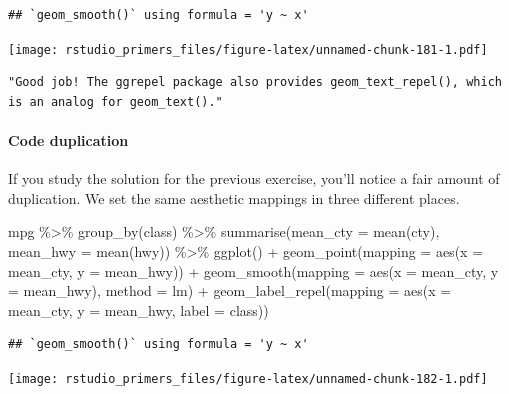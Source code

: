 \documentclass[
]{article}
\newenvironment{Shaded}{\begin{snugshade}}{\end{snugshade}}
\newcommand{\AttributeTok}[1]{\textcolor[rgb]{0.77,0.63,0.00}{#1}}
\newcommand{\FunctionTok}[1]{\textcolor[rgb]{0.00,0.00,0.00}{#1}}
\newcommand{\NormalTok}[1]{#1}
\newcommand{\SpecialCharTok}[1]{\textcolor[rgb]{0.00,0.00,0.00}{#1}}
\begin{document}
\begin{verbatim}
## `geom_smooth()` using formula = 'y ~ x'
\end{verbatim}

\texttt{[image: rstudio\_primers\_files/figure-latex/unnamed-chunk-181-1.pdf]}

\begin{verbatim}
"Good job! The ggrepel package also provides geom_text_repel(), which is an analog for geom_text()."
\end{verbatim}

\hypertarget{code-duplication}{%
\paragraph{Code duplication}\label{code-duplication}}

If you study the solution for the previous exercise, you'll notice a
fair amount of duplication. We set the same aesthetic mappings in three
different places.

\begin{Shaded}
\begin{Highlighting}[]
\NormalTok{mpg }\SpecialCharTok{\%\textgreater{}\%} 
  \FunctionTok{group\_by}\NormalTok{(class) }\SpecialCharTok{\%\textgreater{}\%} 
  \FunctionTok{summarise}\NormalTok{(}\AttributeTok{mean\_cty =} \FunctionTok{mean}\NormalTok{(cty), }\AttributeTok{mean\_hwy =} \FunctionTok{mean}\NormalTok{(hwy)) }\SpecialCharTok{\%\textgreater{}\%} 
  \FunctionTok{ggplot}\NormalTok{() }\SpecialCharTok{+}
    \FunctionTok{geom\_point}\NormalTok{(}\AttributeTok{mapping =} \FunctionTok{aes}\NormalTok{(}\AttributeTok{x =}\NormalTok{ mean\_cty, }\AttributeTok{y =}\NormalTok{ mean\_hwy)) }\SpecialCharTok{+}
    \FunctionTok{geom\_smooth}\NormalTok{(}\AttributeTok{mapping =} \FunctionTok{aes}\NormalTok{(}\AttributeTok{x =}\NormalTok{ mean\_cty, }\AttributeTok{y =}\NormalTok{ mean\_hwy), }\AttributeTok{method =}\NormalTok{ lm) }\SpecialCharTok{+}
    \FunctionTok{geom\_label\_repel}\NormalTok{(}\AttributeTok{mapping =} \FunctionTok{aes}\NormalTok{(}\AttributeTok{x =}\NormalTok{ mean\_cty, }\AttributeTok{y =}\NormalTok{ mean\_hwy, }\AttributeTok{label =}\NormalTok{ class))}
\end{Highlighting}
\end{Shaded}

\begin{verbatim}
## `geom_smooth()` using formula = 'y ~ x'
\end{verbatim}

\texttt{[image: rstudio\_primers\_files/figure-latex/unnamed-chunk-182-1.pdf]}
\end{document}
